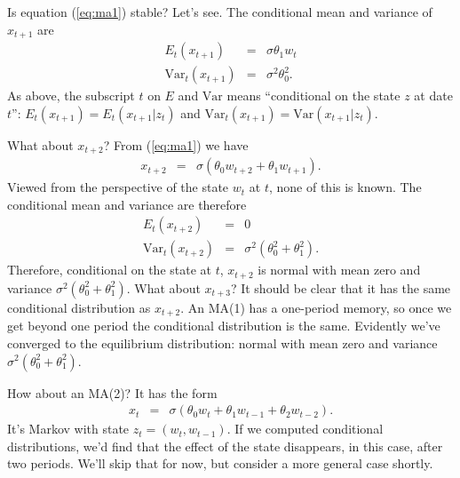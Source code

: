 \documentclass[11pt]{article}
\begin{document}
Is equation (\ref{eq:ma1}) stable?
Let's see.
The conditional mean and variance of $x_{t+1}$ are
\begin{eqnarray*}
    E_t (x_{t+1}) &=& \sigma \theta_1 w_t  \\
    \mbox{Var}_t(x_{t+1} )
            &=&  \sigma^2 \theta_0^2  .
\end{eqnarray*}
As above, the subscript $t$ on $E$ and $\mbox{Var}$
means ``conditional on the state $z$ at date $t$'':
$  E_t (x_{t+1} ) = E_t (x_{t+1} | z_{t} ) $ and
$  \mbox{Var}_t(x_{t+1}  ) =  \mbox{Var}(x_{t+1} | z_{t} ) $.

What about $x_{t+2}$?
From (\ref{eq:ma1}) we have
\begin{eqnarray*}
    x_{t+2}  &=& \sigma \left( \theta_0 w_{t+2} + \theta_1 w_{t+1} \right) .
\end{eqnarray*}
Viewed from the perspective of the state $w_t$ at $t$, none of this is known.
The conditional mean and variance are therefore
\begin{eqnarray*}
    E_t (x_{t+2} ) &=& 0   \\
    \mbox{Var}_t (x_{t+2} )
            &=&  \sigma^2 \left( \theta_0^2 + \theta_1^2 \right).
\end{eqnarray*}
Therefore, conditional on the state at $t$,
$x_{t+2}$ is normal with mean zero and variance $ \sigma^2 (\theta_0^2 + \theta_1^2)$.
What about $x_{t+3}$?
It should be clear that it has the same conditional distribution as $x_{t+2}$.
An MA(1) has a one-period memory, so once we get beyond one period
the conditional distribution is the same.
Evidently we've converged to the equilibrium distribution:
normal with mean zero and variance $ \sigma^2 (\theta_0^2 + \theta_1^2)$.

How about an MA(2)?
It has the form
\begin{eqnarray*}
    x_{t}  &=& \sigma \left( \theta_0 w_{t} + \theta_1 w_{t-1}
    + \theta_2 w_{t-2} \right) .
\end{eqnarray*}
It's Markov with state $z_{t} = (w_{t}, w_{t-1})$.
If we computed conditional distributions, we'd find that the effect
of the state disappears, in this case, after two periods.
We'll skip that for now, but consider a more general case shortly.
\end{document}
